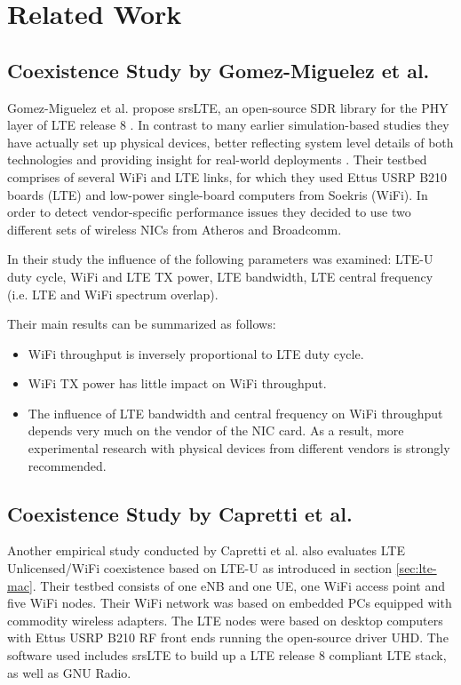 \chapter{Related Work}

\section{Coexistence Study by Gomez-Miguelez et al.}

Gomez-Miguelez et al. propose srsLTE, an open-source SDR library for the PHY layer of LTE release 8 \cite{gomezmiguelez16}. In contrast to many earlier simulation-based studies they have actually set up physical devices, better reflecting system level details of both technologies and providing insight for real-world deployments \cite{rupasinghe14} \cite{nihtilä13} \cite{jeon14} \cite{cavalcante13} . Their testbed comprises of several WiFi and LTE links, for which they used Ettus USRP B210 boards (LTE) and low-power single-board computers from Soekris (WiFi). In order to detect vendor-specific performance issues they decided to use two different sets of wireless NICs from Atheros and Broadcomm.

In their study the influence of the following parameters was examined: LTE-U duty cycle, WiFi and LTE TX power, LTE bandwidth, LTE central frequency (i.e. LTE and WiFi spectrum overlap).

Their main results can be summarized as follows:

\begin{itemize}
	\item WiFi throughput is inversely proportional to LTE duty cycle.
	\item WiFi TX power has little impact on WiFi throughput.
	\item The influence of LTE bandwidth and central frequency on WiFi throughput depends very much on the vendor of the NIC card. As a result, more experimental research with physical devices from different vendors is strongly recommended. 
\end{itemize}

\section{Coexistence Study by Capretti et al.}

Another empirical study \cite{capretti16} conducted by Capretti et al. also evaluates LTE Unlicensed/WiFi coexistence based on LTE-U as introduced in section \ref{sec:lte-mac}.  Their testbed consists of one eNB and one UE, one WiFi access point and five WiFi nodes. Their WiFi network was based on embedded PCs equipped with commodity wireless adapters. The LTE nodes were based on desktop computers with Ettus USRP B210 RF front ends running the open-source driver UHD. The software used includes srsLTE to build up a LTE release 8 compliant LTE stack, as well as GNU Radio. 

